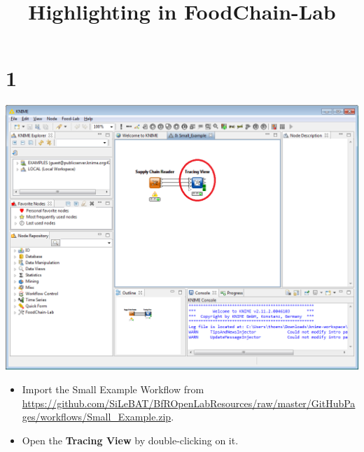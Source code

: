\documentclass{beamer}
\title{Highlighting in FoodChain-Lab}
\date{}
\begin{document}
\maketitle
 
\section{1}
\begin{frame}
	\begin{center}
  		\includegraphics[height=0.6\textheight]{1.png}
	\end{center}
	\begin{itemize}
		\item Import the Small Example Workflow from \url{https://github.com/SiLeBAT/BfROpenLabResources/raw/master/GitHubPages/workflows/Small_Example.zip}.
		\item Open the \textbf{Tracing View} by double-clicking on it.
	\end{itemize}
\end{frame}
\end{document}
